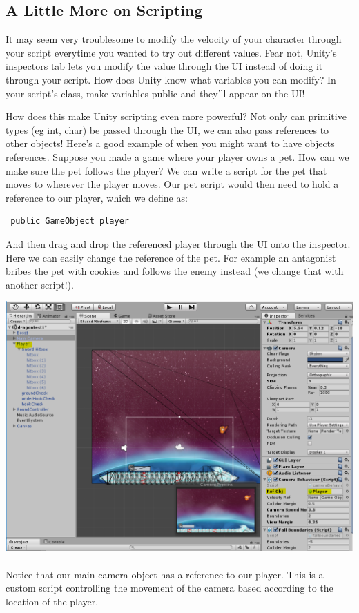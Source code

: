 \documentclass[12pt]{article}
\begin{document}
\subsection{A Little More on Scripting}

It may seem very troublesome to modify the velocity of your character through your script everytime you wanted to try out different values. Fear not, Unity's inspectors tab lets you modify the value through the UI instead of doing it through your script. How does Unity know what variables you can modify? In your script's class, make variables public and they'll appear on the UI!

How does this make Unity scripting even more powerful? Not only can primitive types (eg int, char) be passed through the UI, we can also pass references to other objects! Here's a good example of when you might want to have objects references. Suppose you made a game where your player owns a pet. How can we make sure the pet follows the player? We can write a script for the pet that moves to wherever the player moves. Our pet script would then need to hold a reference to our player, which we define as: \begin{verbatim} public GameObject player \end{verbatim}
And then drag and drop the referenced player through the UI onto the inspector. Here we can easily change the reference of the pet. For example an antagonist bribes the pet with cookies and follows the enemy instead (we change that with another script!).

\includegraphics[scale=0.6]{Figure0331}
\\\\
Notice that our main camera object has a reference to our player. This is a custom script controlling the movement of the camera based according to the location of the player.
\end{document}
